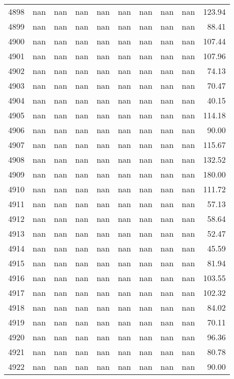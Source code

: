 \begin{tabular}{lrrrrrrrrr}
4898 & nan & nan & nan & nan & nan & nan & nan & nan & 123.94 \\
4899 & nan & nan & nan & nan & nan & nan & nan & nan & 88.41 \\
4900 & nan & nan & nan & nan & nan & nan & nan & nan & 107.44 \\
4901 & nan & nan & nan & nan & nan & nan & nan & nan & 107.96 \\
4902 & nan & nan & nan & nan & nan & nan & nan & nan & 74.13 \\
4903 & nan & nan & nan & nan & nan & nan & nan & nan & 70.47 \\
4904 & nan & nan & nan & nan & nan & nan & nan & nan & 40.15 \\
4905 & nan & nan & nan & nan & nan & nan & nan & nan & 114.18 \\
4906 & nan & nan & nan & nan & nan & nan & nan & nan & 90.00 \\
4907 & nan & nan & nan & nan & nan & nan & nan & nan & 115.67 \\
4908 & nan & nan & nan & nan & nan & nan & nan & nan & 132.52 \\
4909 & nan & nan & nan & nan & nan & nan & nan & nan & 180.00 \\
4910 & nan & nan & nan & nan & nan & nan & nan & nan & 111.72 \\
4911 & nan & nan & nan & nan & nan & nan & nan & nan & 57.13 \\
4912 & nan & nan & nan & nan & nan & nan & nan & nan & 58.64 \\
4913 & nan & nan & nan & nan & nan & nan & nan & nan & 52.47 \\
4914 & nan & nan & nan & nan & nan & nan & nan & nan & 45.59 \\
4915 & nan & nan & nan & nan & nan & nan & nan & nan & 81.94 \\
4916 & nan & nan & nan & nan & nan & nan & nan & nan & 103.55 \\
4917 & nan & nan & nan & nan & nan & nan & nan & nan & 102.32 \\
4918 & nan & nan & nan & nan & nan & nan & nan & nan & 84.02 \\
4919 & nan & nan & nan & nan & nan & nan & nan & nan & 70.11 \\
4920 & nan & nan & nan & nan & nan & nan & nan & nan & 96.36 \\
4921 & nan & nan & nan & nan & nan & nan & nan & nan & 80.78 \\
4922 & nan & nan & nan & nan & nan & nan & nan & nan & 90.00 \\

\end{tabular}
